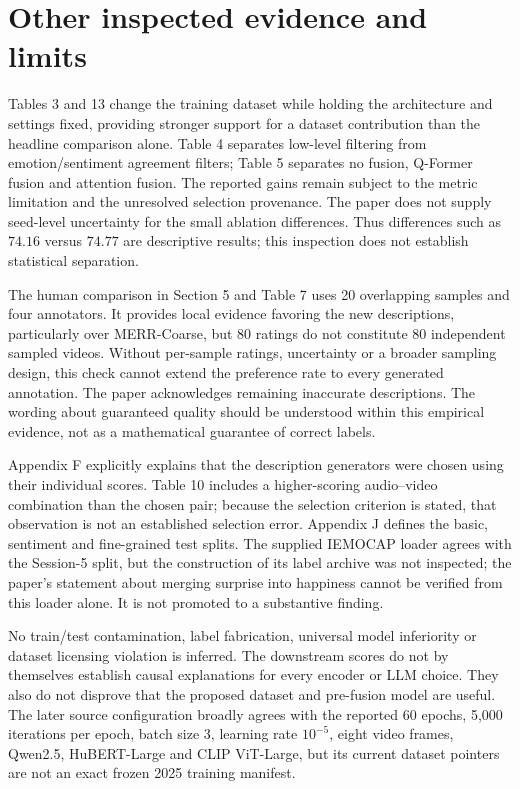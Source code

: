 \documentclass[10pt]{article}
\begin{document}
\section*{Other inspected evidence and limits}
Tables 3 and 13 change the training dataset while holding the architecture and settings fixed, providing stronger support for a dataset contribution than the headline comparison alone. Table 4 separates low-level filtering from emotion/sentiment agreement filters; Table 5 separates no fusion, Q-Former fusion and attention fusion. The reported gains remain subject to the metric limitation and the unresolved selection provenance. The paper does not supply seed-level uncertainty for the small ablation differences. Thus differences such as \(74.16\) versus \(74.77\) are descriptive results; this inspection does not establish statistical separation.\par
The human comparison in Section 5 and Table 7 uses 20 overlapping samples and four annotators. It provides local evidence favoring the new descriptions, particularly over MERR-Coarse, but 80 ratings do not constitute 80 independent sampled videos. Without per-sample ratings, uncertainty or a broader sampling design, this check cannot extend the preference rate to every generated annotation. The paper acknowledges remaining inaccurate descriptions. The wording about guaranteed quality should be understood within this empirical evidence, not as a mathematical guarantee of correct labels.\par
Appendix F explicitly explains that the description generators were chosen using their individual scores. Table 10 includes a higher-scoring audio–video combination than the chosen pair; because the selection criterion is stated, that observation is not an established selection error. Appendix J defines the basic, sentiment and fine-grained test splits. The supplied IEMOCAP loader agrees with the Session-5 split, but the construction of its label archive was not inspected; the paper’s statement about merging surprise into happiness cannot be verified from this loader alone. It is not promoted to a substantive finding.\par
No train/test contamination, label fabrication, universal model inferiority or dataset licensing violation is inferred. The downstream scores do not by themselves establish causal explanations for every encoder or LLM choice. They also do not disprove that the proposed dataset and pre-fusion model are useful. The later source configuration broadly agrees with the reported 60 epochs, 5,000 iterations per epoch, batch size 3, learning rate \(10^{-5}\), eight video frames, Qwen2.5, HuBERT-Large and CLIP ViT-Large, but its current dataset pointers are not an exact frozen 2025 training manifest.\par
\end{document}
